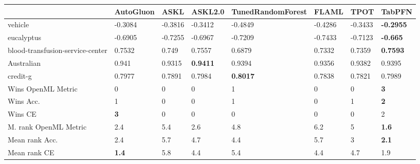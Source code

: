 \begin{tabular}{llllllll}
\toprule
{} &       AutoGluon &            ASKL &          ASKL2.0 & TunedRandomForest &           FLAML &            TPOT &                   TabPFN \\
\midrule
vehicle                          &         -0.3084 &         -0.3816 &          -0.3412 &           -0.4849 &         -0.4286 &         -0.3433 &         \textbf{-0.2955} \\
eucalyptus                       &         -0.6905 &         -0.7255 &          -0.6967 &           -0.7209 &         -0.7433 &         -0.7123 &          \textbf{-0.665} \\
blood-transfusion-service-center &          0.7532 &           0.749 &           0.7557 &            0.6879 &          0.7332 &          0.7359 &          \textbf{0.7593} \\
Australian                       &           0.941 &          0.9315 &  \textbf{0.9411} &            0.9394 &          0.9356 &          0.9382 &                   0.9395 \\
credit-g                         &          0.7977 &          0.7891 &           0.7984 &   \textbf{0.8017} &          0.7838 &          0.7821 &                   0.7989 \\
\midrule
Wins OpenML Metric
                                                     &               0 &               0 &                0 &                 1 &               0 &               0 &               \textbf{3} \\
Wins Acc.                        &               1 &               0 &                0 &                 1 &               0 &               1 &               \textbf{2} \\
Wins CE                          &      \textbf{3} &               0 &                0 &                 0 &               0 &               0 &                        2 \\
\midrule
M. rank OpenML Metric
                                                  &             2.4 &             5.4 &              2.6 &               4.8 &             6.2 &               5 &             \textbf{1.6} \\
Mean rank Acc.                   &             2.4 &             5.7 &              4.7 &               4.4 &             5.7 &               3 &             \textbf{2.1} \\
Mean rank CE                     &    \textbf{1.4} &             5.8 &              4.4 &               5.4 &             4.4 &             4.7 &                      1.9 \\

\end{tabular}
